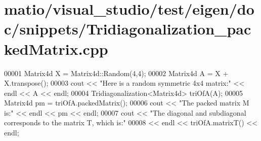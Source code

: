 \hypertarget{matio_2visual__studio_2test_2eigen_2doc_2snippets_2_tridiagonalization__packed_matrix_8cpp_source}{}\section{matio/visual\+\_\+studio/test/eigen/doc/snippets/\+Tridiagonalization\+\_\+packed\+Matrix.cpp}
\label{matio_2visual__studio_2test_2eigen_2doc_2snippets_2_tridiagonalization__packed_matrix_8cpp_source}

\begin{DoxyCode}
00001 Matrix4d X = Matrix4d::Random(4,4);
00002 Matrix4d A = X + X.transpose();
00003 cout << \textcolor{stringliteral}{"Here is a random symmetric 4x4 matrix:"} << endl << A << endl;
00004 Tridiagonalization<Matrix4d> triOfA(A);
00005 Matrix4d pm = triOfA.packedMatrix();
00006 cout << \textcolor{stringliteral}{"The packed matrix M is:"} << endl << pm << endl;
00007 cout << \textcolor{stringliteral}{"The diagonal and subdiagonal corresponds to the matrix T, which is:"} 
00008      << endl << triOfA.matrixT() << endl;
\end{DoxyCode}
